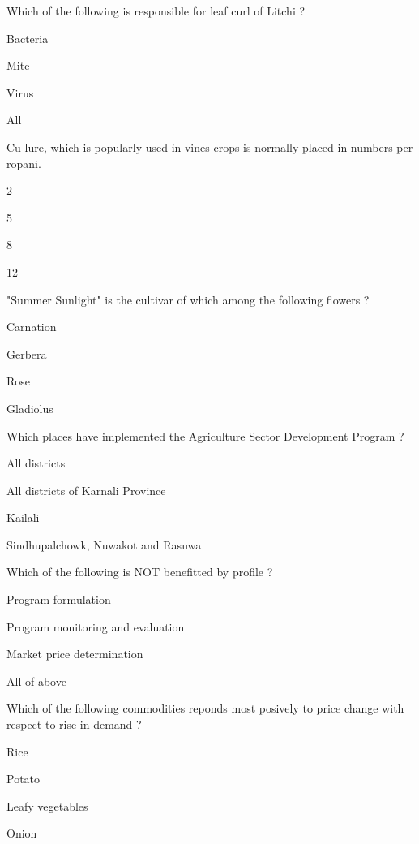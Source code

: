 \begin{questions}
\question Which of the following is responsible for leaf curl of Litchi ?
\begin{items}
\item Bacteria
\item* Mite
\item Virus
\item All
\end{items}

\question Cu-lure, which is popularly used in vines crops is normally placed \fillin[][3cm] in numbers per ropani.
\begin{items}
\item 2
\item* 5
\item 8
\item 12
\end{items}

\question "Summer Sunlight" is the cultivar of which among the following flowers ?
\begin{items}
\item Carnation
\item Gerbera
\item Rose
\item* Gladiolus
\end{items}

\question Which places have implemented the Agriculture Sector Development Program ?
\begin{items}
\item All districts
\item* All districts of Karnali Province
\item Kailali
\item Sindhupalchowk, Nuwakot and Rasuwa
\end{items}

\question Which of the following is NOT benefitted by profile ?
\begin{items}
\item Program formulation
\item Program monitoring and evaluation
\item* Market price determination
\item All of above
\end{items}

\question Which of the following commodities reponds most posively to price change with respect to rise in demand ?
\begin{items}
\item Rice
\item Potato
\item* Leafy vegetables
\item Onion
\end{items}


\end{questions}
